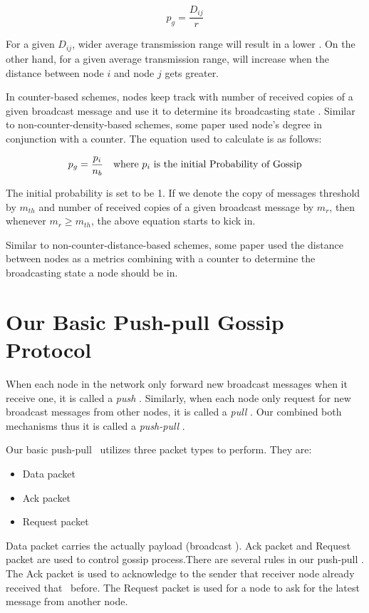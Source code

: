 \[ p_g = \frac{D_{ij}}{r}\]

For a given $D_{ij}$, wider average transmission range will result in a lower \emph{\pog}. On the other hand, for a given average transmission range, \emph{\pog} will increase when the distance between node $i$ and node $j$ gets greater.

In counter-based schemes, nodes keep track with number of received copies of a given broadcast message and use it to determine its broadcasting state \cite{2015survey}. Similar to non-counter-density-based schemes, some paper \cite{lee2010adaptive} used node's degree in conjunction with a counter. The equation used to calculate \emph{\pog} is as follows:

\[ p_g = \frac{p_i}{n_b} \quad \mbox{where } p_i \mbox{ is the initial Probability of Gossip}\]

The initial probability is set to be 1. If we denote the copy of messages threshold by $m_{th}$ and number of received copies of a given broadcast message by $m_r$, then whenever $m_r \geq m_{th}$, the above equation starts to kick in.

Similar to non-counter-distance-based schemes, some paper \cite{khan2008distance}\cite{ling2005coverage} used the distance between nodes as a metrics combining with a counter to determine the broadcasting state a node should be in. 

\section{Our Basic Push-pull Gossip Protocol} \label{pp}
When each node in the network only forward new broadcast messages when it receive one, it is called a \emph{push} \gp. Similarly, when each node only request for new broadcast messages from other nodes, it is called  a \emph{pull} \gp. Our \gp combined both mechanisms thus it is called a \emph{push-pull} \gp. 

Our basic push-pull \gp ~utilizes three packet types to perform. They are:
\begin{itemize}
	\item Data packet
	\item Ack packet 
	\item Request packet
\end{itemize}

Data packet carries the actually payload (broadcast \msg). Ack packet and Request packet are used to control gossip process.There are several rules in our push-pull \gp. The Ack packet is used to acknowledge to the sender that receiver node already received that \msg ~before. The Request packet is used for a node to ask for the latest message from another node.

